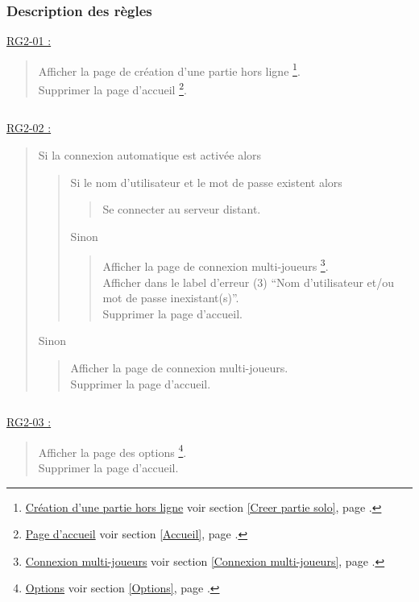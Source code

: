 \documentclass{report}
\begin{document}
\newpage

		\subsubsection{Description des règles}
		
		\underline{RG2-01 :}
			\begin{quote}
				Afficher la page de création d'une partie hors ligne
					\footnote[1]{
						\hyperlink{Creer partie solo}{Création d'une partie hors ligne}
						\og voir section \ref{Creer partie solo}, page \pageref{Creer partie solo}.\fg
					}.\\
				Supprimer la page d'accueil%
					\footnote[2]{
						\hyperlink{Page d'accueil}{Page d'accueil}
						\og voir section \ref{Accueil}, page \pageref{Accueil}.\fg
					}.
			\end{quote}

		$\,$

		\underline{RG2-02 :}
			\begin{quote}
				Si la connexion automatique est activée alors
				\begin{quote}
					Si le nom d'utilisateur et le mot de passe existent alors
					\begin{quote}
						Se connecter au serveur distant.
					\end{quote}	
					Sinon
					\begin{quote}
						Afficher la page de connexion multi-joueurs%
							\footnote[3]{
								\hyperlink{Connexion multi-joueurs}{Connexion multi-joueurs}
								\og voir section \ref{Connexion multi-joueurs}, page \pageref{Connexion multi-joueurs}.\fg
							}.\\
						Afficher dans le label d'erreur (3) ``Nom d'utilisateur et/ou mot de passe inexistant(s)''.\\
						Supprimer la page d'accueil\footnotemark[2].
					\end{quote}	
				\end{quote}
				Sinon
				\begin{quote}		
					Afficher la page de connexion multi-joueurs\footnotemark[3].\\
					Supprimer la page d'accueil\footnotemark[2].
				\end{quote}
			\end{quote}

		$\,$
		
		\underline{RG2-03 :}
			\begin{quote}
				Afficher la page des options%
					\footnote[4]{
						\hyperlink{Options}{Options}
						\og voir section \ref{Options}, page \pageref{Options}.\fg
					}.\\
				Supprimer la page d'accueil\footnotemark[2].
			\end{quote}
\end{document}
